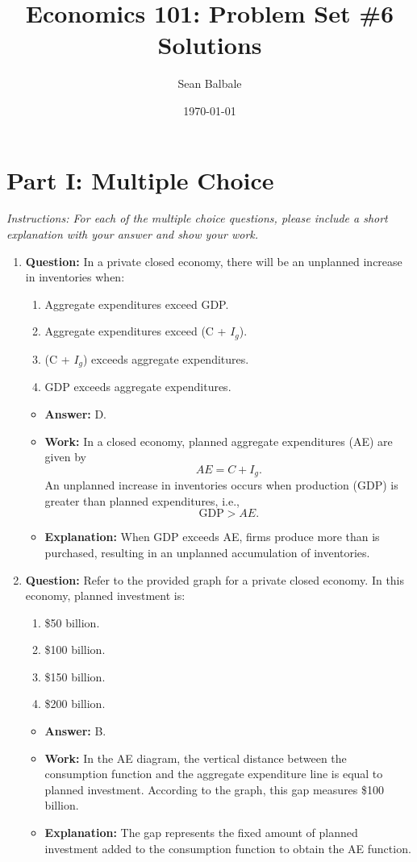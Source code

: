 \documentclass{article}
\title{Economics 101: Problem Set \#6 Solutions}
\author{Sean Balbale}
\date{\today}
\begin{document}
\maketitle

\section*{Part I: Multiple Choice}
\textit{Instructions: For each of the multiple choice questions, please include a short explanation with your answer and show your work.}

\begin{enumerate}[label=\arabic*.]
  \item \textbf{Question:} In a private closed economy, there will be an unplanned increase in inventories when:
    \begin{enumerate}[label=(\Alph*)]
      \item Aggregate expenditures exceed GDP.
      \item Aggregate expenditures exceed (C + $I_g$).
      \item (C + $I_g$) exceeds aggregate expenditures.
      \item GDP exceeds aggregate expenditures.
    \end{enumerate}
    \begin{itemize}
      \item \textbf{Answer:} D.
      \item \textbf{Work:} In a closed economy, planned aggregate expenditures (AE) are given by
        \[
          AE = C + I_g.
        \]
        An unplanned increase in inventories occurs when production (GDP) is greater than planned expenditures, i.e.,
        \[
          \text{GDP} > AE.
        \]
      \item \textbf{Explanation:} When GDP exceeds AE, firms produce more than is purchased, resulting in an unplanned accumulation of inventories.
    \end{itemize}

  \item \textbf{Question:} Refer to the provided graph for a private closed economy. In this economy, planned investment is:
    \begin{enumerate}[label=(\Alph*)]
      \item \$50 billion.
      \item \$100 billion.
      \item \$150 billion.
      \item \$200 billion.
    \end{enumerate}
    \begin{itemize}
      \item \textbf{Answer:} B.
      \item \textbf{Work:} In the AE diagram, the vertical distance between the consumption function and the aggregate expenditure line is equal to planned investment. According to the graph, this gap measures \$100 billion.
      \item \textbf{Explanation:} The gap represents the fixed amount of planned investment added to the consumption function to obtain the AE function.
    \end{itemize}


\end{enumerate}
\end{document}
